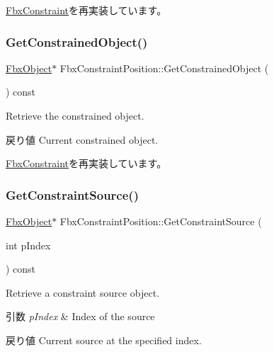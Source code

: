 \hyperlink{class_fbx_constraint_a0470a25b813b337d07a03ce4b97b44f8}{Fbx\+Constraint}を再実装しています。

\mbox{\label{class_fbx_constraint_position_a2722540075ef79aa2d14e7e838afaf79}} 
\subsubsection{\texorpdfstring{Get\+Constrained\+Object()}{GetConstrainedObject()}}
{\footnotesize\ttfamily \hyperlink{class_fbx_object}{Fbx\+Object}$\ast$ Fbx\+Constraint\+Position\+::\+Get\+Constrained\+Object (\begin{DoxyParamCaption}{ }\end{DoxyParamCaption}) const\hspace{0.3cm}{\ttfamily [virtual]}}

Retrieve the constrained object. \begin{DoxyReturn}{戻り値}
Current constrained object. 
\end{DoxyReturn}


\hyperlink{class_fbx_constraint_a7f587d5db9685b5ee925a85354263edc}{Fbx\+Constraint}を再実装しています。

\mbox{\label{class_fbx_constraint_position_a0024d10c8464eba13d5f3c3037e973cf}} 
\subsubsection{\texorpdfstring{Get\+Constraint\+Source()}{GetConstraintSource()}}
{\footnotesize\ttfamily \hyperlink{class_fbx_object}{Fbx\+Object}$\ast$ Fbx\+Constraint\+Position\+::\+Get\+Constraint\+Source (\begin{DoxyParamCaption}\item[{int}]{p\+Index }\end{DoxyParamCaption}) const\hspace{0.3cm}{\ttfamily [virtual]}}

Retrieve a constraint source object. 
\begin{DoxyParams}{引数}
{\em p\+Index} & Index of the source \\
\hline
\end{DoxyParams}
\begin{DoxyReturn}{戻り値}
Current source at the specified index. 
\end{DoxyReturn}


